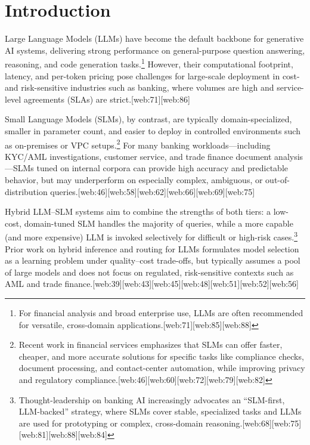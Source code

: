 \documentclass[11pt]{article}
\begin{document}
\section{Introduction}

Large Language Models (LLMs) have become the default backbone for generative AI systems, delivering strong performance on general-purpose question answering, reasoning, and code generation tasks.\footnote{For financial analysis and broad enterprise use, LLMs are often recommended for versatile, cross-domain applications.[web:71][web:85][web:88]} However, their computational footprint, latency, and per-token pricing pose challenges for large-scale deployment in cost- and risk-sensitive industries such as banking, where volumes are high and service-level agreements (SLAs) are strict.[web:71][web:86] 

Small Language Models (SLMs), by contrast, are typically domain-specialized, smaller in parameter count, and easier to deploy in controlled environments such as on-premises or VPC setups.\footnote{Recent work in financial services emphasizes that SLMs can offer faster, cheaper, and more accurate solutions for specific tasks like compliance checks, document processing, and contact-center automation, while improving privacy and regulatory compliance.[web:46][web:60][web:72][web:79][web:82]} For many banking workloads---including KYC/AML investigations, customer service, and trade finance document analysis---SLMs tuned on internal corpora can provide high accuracy and predictable behavior, but may underperform on especially complex, ambiguous, or out-of-distribution queries.[web:46][web:58][web:62][web:66][web:69][web:75] 

Hybrid LLM--SLM systems aim to combine the strengths of both tiers: a low-cost, domain-tuned SLM handles the majority of queries, while a more capable (and more expensive) LLM is invoked selectively for difficult or high-risk cases.\footnote{Thought-leadership on banking AI increasingly advocates an ``SLM-first, LLM-backed'' strategy, where SLMs cover stable, specialized tasks and LLMs are used for prototyping or complex, cross-domain reasoning.[web:68][web:75][web:81][web:88][web:84]} Prior work on hybrid inference and routing for LLMs formulates model selection as a learning problem under quality--cost trade-offs, but typically assumes a pool of large models and does not focus on regulated, risk-sensitive contexts such as AML and trade finance.[web:39][web:43][web:45][web:48][web:51][web:52][web:56] 
\end{document}
